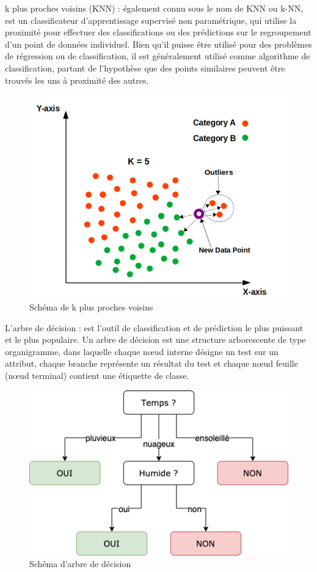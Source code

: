 \documentclass[a4paper,12pt]{report}
\begin{document}
\textcolor{colortxt}{k plus proches voisins (KNN) :}
\noindent \normalsize également connu sous le nom de KNN ou k-NN, est un classificateur d'apprentissage supervisé non paramétrique, qui utilise la proximité pour effectuer des classifications ou des prédictions sur le regroupement d'un point de données individuel. Bien qu'il puisse être utilisé pour des problèmes de régression ou de classification, il est généralement utilisé comme algorithme de classification, partant de l'hypothèse que des points similaires peuvent être trouvés les uns à proximité des autres.
\begin{figure}[H]
\centering
 \includegraphics[scale=0.9]{outils-images/data13.png}
\caption{Schéma de k plus proches voisins}
\end{figure}

\textcolor{colortxt}{L'arbre de décision :}
\noindent \normalsize est l'outil de classification et de prédiction le plus puissant et le plus populaire. Un arbre de décision est une structure arborescente de type organigramme, dans laquelle chaque nœud interne désigne un test sur un attribut, chaque branche représente un résultat du test et chaque nœud feuille (nœud terminal) contient une étiquette de classe.
\begin{figure}[H]
\centering
 \includegraphics[scale=0.7]{outils-images/data14.jpg}
\caption{Schéma d'arbre de décision}
\end{figure}
\end{document}
